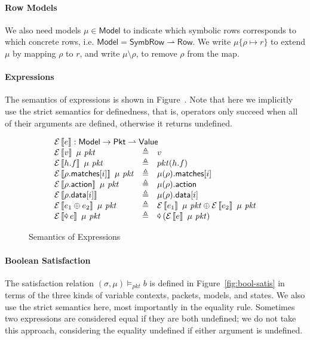 \documentclass{article}
\newcommand{\pkt}{\mathit{pkt}}
\newcommand{\denote}[1]{\left\llbracket#1\right\rrbracket}
\newcommand{\edenote}[1]{\mathcal{E}\denote{#1}}
\newcommand{\binop}{\mathbin{\oplus}}
\newcommand{\unop}{\mathop{\text{\pointer}}}
\newcommand{\Value}{\mathsf{Value}}
\newcommand{\Pkt}{\mathsf{Pkt}}
\newcommand{\Model}{\mathsf{Model}}
\newcommand{\Row}{\mathsf{Row}}
\newcommand{\SymbRow}{\mathsf{SymbRow}}
\newcommand{\matches}{\mathsf{matches}}
\newcommand{\action}{\mathsf{action}}
\newcommand{\data}{\mathsf{data}}
\newcommand{\satisfy}[3]{({#1,#3}) \models_{#2}}
\begin{document}
\paragraph{Row Models}
We also need models $\mu \in \Model$ to indicate which symbolic rows corresponds
to which concrete rows, i.e. $\Model = \SymbRow \rightharpoonup \Row$. We write
$\mu\{\rho \mapsto r\}$ to extend $\mu$ by mapping $\rho$ to $r$, and write $\mu
\setminus \rho$, to remove $\rho$ from the map.

\paragraph{Expressions}
The semantics of expressions is shown in Figure~\label{fig:sem-expr}. Note that
here we implicitly use the strict semantics for definedness, that is, operators
only succeed when all of their arguments are defined, otherwise it returns
undefined.

\begin{figure}[H]
  \[\begin{array}{l>{\triangleq}cl}
  \multicolumn{3}{l}{\edenote{e} : \Model \to \Pkt \rightharpoonup \Value }\\
    \edenote{v}~\mu~\pkt &&
    v \\
    \edenote{h.f}~\mu~\pkt &&
    pkt(h.f)\\
    \edenote{\rho.\matches[i]}~\mu~\pkt &&
    \mu(\rho).\matches[i] \\
    \edenote{\rho.\action}~\mu~\pkt &&
    \mu(\rho).\action \\
    \edenote{\rho.\data[i]} &&
    \mu(\rho).\data[i]\\
    \edenote{e_1 \binop e_2}~\mu~\pkt&&
    \edenote{e_1}~\mu~\pkt \binop
    \edenote{e_2}~\mu~\pkt \\
    \edenote{\unop e}~\mu~\pkt &&
    \unop \left(\edenote{e}~\mu~\pkt\right)
  \end{array}
  \]
  \caption{Semantics of Expressions}
  \label{fig:sem-expr}
\end{figure}

\paragraph{Boolean Satisfaction}
The satisfaction relation $\satisfy \sigma \pkt \mu b$ is defined in
Figure~\ref{fig:bool-satis} in terms of the three kinds of variable contexts,
packets, models, and states. We also use the strict semantics here, most
importantly in the equality rule. Sometimes two expressions are considered equal
if they are both undefined; we do not take this approach, considering the
equality undefined if either argument is undefined.
\end{document}
